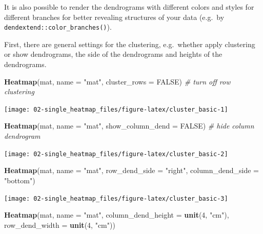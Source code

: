 \documentclass[]{book}
\newenvironment{Shaded}{\begin{snugshade}}{\end{snugshade}}
\newcommand{\KeywordTok}[1]{\textcolor[rgb]{0.13,0.29,0.53}{\textbf{#1}}}
\newcommand{\DataTypeTok}[1]{\textcolor[rgb]{0.13,0.29,0.53}{#1}}
\newcommand{\DecValTok}[1]{\textcolor[rgb]{0.00,0.00,0.81}{#1}}
\newcommand{\StringTok}[1]{\textcolor[rgb]{0.31,0.60,0.02}{#1}}
\newcommand{\CommentTok}[1]{\textcolor[rgb]{0.56,0.35,0.01}{\textit{#1}}}
\newcommand{\OtherTok}[1]{\textcolor[rgb]{0.56,0.35,0.01}{#1}}
\newcommand{\NormalTok}[1]{#1}
\theoremstyle{definition}
\theoremstyle{definition}
\theoremstyle{definition}
\theoremstyle{remark}
\begin{document}
It is also possible to render the dendrograms with different colors and
styles for different branches for better revealing structures of your
data (e.g.~by \texttt{dendextend::color\_branches()}).

First, there are general settings for the clustering, e.g.~whether apply
clustering or show dendrograms, the side of the dendrograms and heights
of the dendrograms.

\begin{Shaded}
\begin{Highlighting}[]
\KeywordTok{Heatmap}\NormalTok{(mat, }\DataTypeTok{name =} \StringTok{"mat"}\NormalTok{, }\DataTypeTok{cluster_rows =} \OtherTok{FALSE}\NormalTok{) }\CommentTok{# turn off row clustering}
\end{Highlighting}
\end{Shaded}

\begin{center}\texttt{[image: 02-single\_heatmap\_files/figure-latex/cluster\_basic-1]} \end{center}

\begin{Shaded}
\begin{Highlighting}[]
\KeywordTok{Heatmap}\NormalTok{(mat, }\DataTypeTok{name =} \StringTok{"mat"}\NormalTok{, }\DataTypeTok{show_column_dend =} \OtherTok{FALSE}\NormalTok{) }\CommentTok{# hide column dendrogram}
\end{Highlighting}
\end{Shaded}

\begin{center}\texttt{[image: 02-single\_heatmap\_files/figure-latex/cluster\_basic-2]} \end{center}

\begin{Shaded}
\begin{Highlighting}[]
\KeywordTok{Heatmap}\NormalTok{(mat, }\DataTypeTok{name =} \StringTok{"mat"}\NormalTok{, }\DataTypeTok{row_dend_side =} \StringTok{"right"}\NormalTok{, }\DataTypeTok{column_dend_side =} \StringTok{"bottom"}\NormalTok{)}
\end{Highlighting}
\end{Shaded}

\begin{center}\texttt{[image: 02-single\_heatmap\_files/figure-latex/cluster\_basic-3]} \end{center}

\begin{Shaded}
\begin{Highlighting}[]
\KeywordTok{Heatmap}\NormalTok{(mat, }\DataTypeTok{name =} \StringTok{"mat"}\NormalTok{, }\DataTypeTok{column_dend_height =} \KeywordTok{unit}\NormalTok{(}\DecValTok{4}\NormalTok{, }\StringTok{"cm"}\NormalTok{), }
    \DataTypeTok{row_dend_width =} \KeywordTok{unit}\NormalTok{(}\DecValTok{4}\NormalTok{, }\StringTok{"cm"}\NormalTok{))}
\end{Highlighting}
\end{Shaded}
\end{document}
